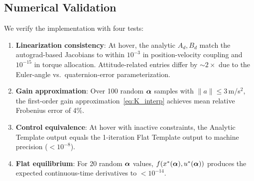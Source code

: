 \subsection{Numerical Validation}

We verify the implementation with four tests:
\begin{enumerate}
  \item \textbf{Linearization consistency}: At hover,
    the analytic $A_d, B_d$ match the autograd-based Jacobians
    to within $10^{-3}$ in position-velocity coupling and
    $10^{-15}$ in torque allocation.
    Attitude-related entries differ by ${\sim}2\times$ due to
    the Euler-angle vs.\ quaternion-error parameterization.
  \item \textbf{Gain approximation}: Over 100 random $\bm{\alpha}$ samples
    with $\|a\| \leq 3$\,m/s$^2$,
    the first-order gain approximation~\eqref{eq:K_interp}
    achieves mean relative Frobenius error of 4\%.
  \item \textbf{Control equivalence}: At hover with inactive
    constraints, the Analytic Template output equals
    the 1-iteration Flat Template output to machine precision
    ($< 10^{-8}$).
  \item \textbf{Flat equilibrium}: For 20 random $\bm{\alpha}$ values,
    $f(x^*(\bm{\alpha}), u^*(\bm{\alpha}))$ produces the expected
    continuous-time derivatives to $< 10^{-14}$.
\end{enumerate}
